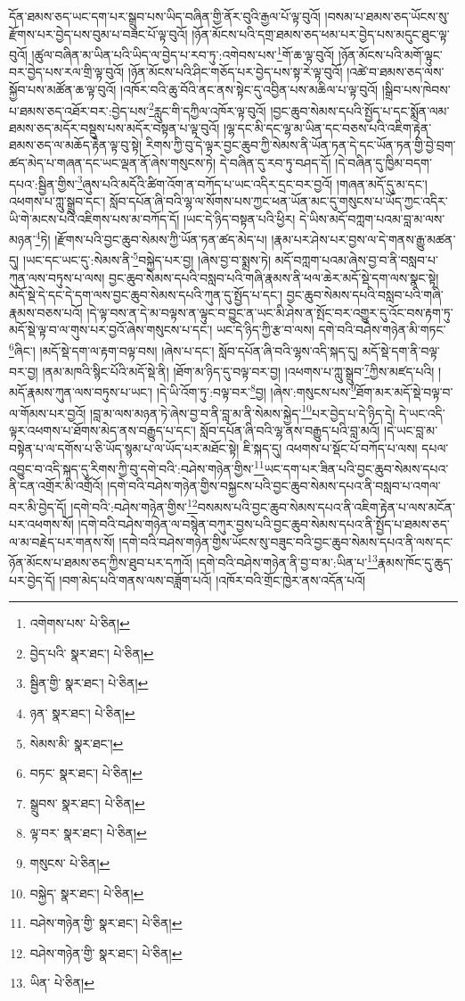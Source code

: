 དོན་ཐམས་ཅད་ཡང་དག་པར་སྒྲུབ་པས་ཡིད་བཞིན་གྱི་ནོར་བུའི་རྒྱལ་པོ་ལྟ་བུའོ། །བསམ་པ་ཐམས་ཅད་ཡོངས་སུ་རྫོགས་པར་བྱེད་པས་བུམ་པ་བཟང་པོ་ལྟ་བུའོ། །ཉོན་མོངས་པའི་དགྲ་ཐམས་ཅད་ཕམ་པར་བྱེད་པས་མདུང་ཐུང་ལྟ་བུའོ། །ཚུལ་བཞིན་མ་ཡིན་པའི་ཡིད་ལ་བྱེད་པ་རབ་ཏུ་:འགེབས་པས་\footnote{འགེགས་པས་  པེ་ཅིན། }གོ་ཆ་ལྟ་བུའོ། །ཉོན་མོངས་པའི་མགོ་ལྟུང་བར་བྱེད་པས་རལ་གྲི་ལྟ་བུའོ། །ཉོན་མོངས་པའི་ཤིང་གཅོད་པར་བྱེད་པས་སྟ་རེ་ལྟ་བུའོ། །འཚེ་བ་ཐམས་ཅད་ལས་སྐྱོབ་པས་མཚོན་ཆ་ལྟ་བུའོ། །འཁོར་བའི་ཆུ་བོའི་ནང་ནས་སྟེང་དུ་འབྱིན་པས་མཆིལ་པ་ལྟ་བུའོ། །སྒྲིབ་པས་ཁེབས་པ་ཐམས་ཅད་འཐོར་བར་:བྱེད་པས་\footnote{བྱེད་པའི་  སྣར་ཐང་།  པེ་ཅིན། }རླུང་གི་དཀྱིལ་འཁོར་ལྟ་བུའོ། །བྱང་ཆུབ་སེམས་དཔའི་སྤྱོད་པ་དང་སྨོན་ལམ་ཐམས་ཅད་མདོར་བསྡུས་པས་མདོར་བསྟན་པ་ལྟ་བུའོ། །ལྷ་དང་མི་དང་ལྷ་མ་ཡིན་དང་བཅས་པའི་འཇིག་རྟེན་ཐམས་ཅད་ལ་མཆོད་རྟེན་ལྟ་བུ་སྟེ། རིགས་ཀྱི་བུ་དེ་ལྟར་བྱང་ཆུབ་ཀྱི་སེམས་ནི་ཡོན་ཏན་དེ་དང་ཡོན་ཏན་གྱི་བྱེ་བྲག་ཚད་མེད་པ་གཞན་དང་ཡང་ལྡན་ནོ་ཞེས་གསུངས་ཏེ། དེ་བཞིན་དུ་རབ་ཏུ་བཤད་དོ། །དེ་བཞིན་དུ་ཁྱིམ་བདག་དཔའ་:སྦྱིན་གྱིས་\footnote{སྦྱིན་གྱི་  སྣར་ཐང་།  པེ་ཅིན། }ཞུས་པའི་མདོའི་ཚིག་འོག་ན་བཀོད་པ་ཡང་འདིར་དྲང་བར་བྱའོ། །གཞན་མདོ་དུ་མ་དང་། འཕགས་པ་ཀླུ་སྒྲུབ་དང་། སློབ་དཔོན་ཞི་བའི་ལྷ་ལ་སོགས་པས་ཀྱང་ཕན་ཡོན་མང་དུ་གསུངས་པ་ཡོད་ཀྱང་འདིར་ཡི་གེ་མངས་པའི་འཇིགས་པས་མ་བཀོད་དོ། །ཡང་དེ་ཉིད་བསྟན་པའི་ཕྱིར། དེ་ཡིས་མདོ་བཀླག་པའམ་བླ་མ་ལས་མཉན་\footnote{ཉན་  སྣར་ཐང་།  པེ་ཅིན། }ཏེ། །རྫོགས་པའི་བྱང་ཆུབ་སེམས་ཀྱི་ཡོན་ཏན་ཚད་མེད་པ། །རྣམ་པར་ཤེས་པར་བྱས་ལ་དེ་གནས་རྒྱུ་མཚན་དུ། །ཡང་དང་ཡང་དུ་:སེམས་ནི་\footnote{སེམས་མི་  སྣར་ཐང་། }བསྐྱེད་པར་བྱ། །ཞེས་བྱ་བ་སྨྲས་ཏེ། མདོ་བཀླག་པའམ་ཞེས་བྱ་བ་ནི་བསླབ་པ་ཀུན་ལས་བཏུས་པ་ལས། བྱང་ཆུབ་སེམས་དཔའི་བསླབ་པའི་གཞི་རྣམས་ནི་ཕལ་ཆེར་མདོ་སྡེ་དག་ལས་སྣང་སྟེ། མདོ་སྡེ་དེ་དང་དེ་དག་ལས་བྱང་ཆུབ་སེམས་དཔའི་ཀུན་དུ་སྤྱོད་པ་དང་། བྱང་ཆུབ་སེམས་དཔའི་བསླབ་པའི་གཞི་རྣམས་བཅས་པའོ། །དེ་ལྟ་བས་ན་དེ་མ་བལྟས་ན་ལྟུང་བ་བྱུང་ན་ཡང་མི་ཤེས་ན་སྤོང་བར་འགྱུར་དུ་འོང་བས་རྟག་ཏུ་མདོ་སྡེ་ལྟ་བ་ལ་གུས་པར་བྱའོ་ཞེས་གསུངས་པ་དང་། ཡང་དེ་ཉིད་ཀྱི་རྩ་བ་ལས། དགེ་བའི་བཤེས་གཉེན་མི་གཏང་\footnote{བཏང་  སྣར་ཐང་།  པེ་ཅིན། }ཞིང་། །མདོ་སྡེ་དག་ལ་རྟག་བལྟ་བས། །ཞེས་པ་དང་། སློབ་དཔོན་ཞི་བའི་ལྷས་འདི་སྐད་དུ། མདོ་སྡེ་དག་ནི་བལྟ་བར་བྱ། །ནམ་མཁའི་སྙིང་པོའི་མདོ་སྡེ་ནི། །ཐོག་མ་ཉིད་དུ་བལྟ་བར་བྱ། །འཕགས་པ་ཀླུ་སྒྲུབ་\footnote{སྒྲུབས་  སྣར་ཐང་།  པེ་ཅིན། }ཀྱིས་མཛད་པའི། །མདོ་རྣམས་ཀུན་ལས་བཏུས་པ་ཡང་། །དེ་ཡི་འོག་ཏུ་:བལྟ་བར་\footnote{ལྟ་བར་  སྣར་ཐང་།  པེ་ཅིན། }བྱ། །ཞེས་:གསུངས་པས་\footnote{གསུངས་  པེ་ཅིན། }ཐོག་མར་མདོ་སྡེ་བལྟ་བ་ལ་གོམས་པར་བྱའོ། །བླ་མ་ལས་མཉན་ཏེ་ཞེས་བྱ་བ་ནི་བླ་མ་ནི་སེམས་སྐྱེད་\footnote{བསྐྱེད་  སྣར་ཐང་།  པེ་ཅིན། }པར་བྱེད་པ་དེ་ཉིད་དེ། དེ་ཡང་འདི་ལྟར་འཕགས་པ་ཐོགས་མེད་ནས་བརྒྱུད་པ་དང་། སློབ་དཔོན་ཞི་བའི་ལྷ་ནས་བརྒྱུད་པའི་བླ་མའོ། །དེ་ཡང་བླ་མ་བསྟེན་པ་ལ་དགོས་པ་ཅི་ཡོད་སྙམ་པ་ལ་ཡོད་པར་མཐོང་སྟེ། ཇི་སྐད་དུ། འཕགས་པ་སྡོང་པོ་བཀོད་པ་ལས། དཔལ་འབྱུང་བ་འདི་སྐད་དུ་རིགས་ཀྱི་བུ་དགེ་བའི་:བཤེས་གཉེན་གྱིས་\footnote{བཤེས་གཉེན་གྱི་  སྣར་ཐང་།  པེ་ཅིན། }ཡང་དག་པར་ཟིན་པའི་བྱང་ཆུབ་སེམས་དཔའ་ནི་ངན་འགྲོར་མི་འགྲོའོ། །དགེ་བའི་བཤེས་གཉེན་གྱིས་བསྐྱངས་པའི་བྱང་ཆུབ་སེམས་དཔའ་ནི་བསླབ་པ་འགལ་བར་མི་བྱེད་དོ། །དགེ་བའི་:བཤེས་གཉེན་གྱིས་\footnote{བཤེས་གཉེན་གྱི་  སྣར་ཐང་།  པེ་ཅིན། }བསམས་པའི་བྱང་ཆུབ་སེམས་དཔའ་ནི་འཇིག་རྟེན་པ་ལས་མངོན་པར་འཕགས་སོ། །དགེ་བའི་བཤེས་གཉེན་ལ་བསྙེན་བཀུར་བྱས་པའི་བྱང་ཆུབ་སེམས་དཔའ་ནི་སྤྱོད་པ་ཐམས་ཅད་ལ་མ་བརྗེད་པར་གནས་སོ། །དགེ་བའི་བཤེས་གཉེན་གྱིས་ཡོངས་སུ་བཟུང་བའི་བྱང་ཆུབ་སེམས་དཔའ་ནི་ལས་དང་ཉོན་མོངས་པ་ཐམས་ཅད་ཀྱིས་ཐུབ་པར་དཀའོ། །དགེ་བའི་བཤེས་གཉེན་ནི་བྱ་བ་མ་:ཡིན་པ་\footnote{ཡིན་  པེ་ཅིན། }རྣམས་ཁོང་དུ་ཆུད་པར་བྱེད་དོ། །བག་མེད་པའི་གནས་ལས་བཟློག་པའོ། །འཁོར་བའི་གྲོང་ཁྱེར་ནས་འདོན་པའོ། 